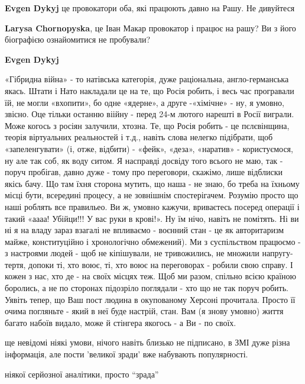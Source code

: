 \begin{itemize}
\begin{itemize}
\textbf{Evgen Dykyj} це провокатори оба, які працюють давно на Рашу. Не дивуйтеся

\textbf{Larysa Chornopyska}, це Іван Макар провокатор і працює на рашу? Ви з його біографією ознайомитися не пробували?

\textbf{Evgen Dykyj} 

«Гібридна війна» - то натівська категорія, дуже раціональна, англо-германська
якась. Штати і Нато накладали це на те, що Росія робить, і весь час програвали
їй, не могли «вхопити», бо одне «ядерне», а друге -«хімічне» - ну, я умовно,
звісно. Оце тільки останню віійну - перед 24-м лютого нарешті в Росії виграли.
Може когось з росіян залучили, хтозна. Те, що Росія робить - це пєлєвінщина,
теорія віртуальних реальностей і т.д., навіть слова нелегко підібрати, щоб
«запеленгувати» (і, отже, відбити) - «фейк», «деза», «наратив» - користуємося,
ну але так соб, як воду ситом. Я насправді досвіду того всього не маю, так -
поруч пробігав, давно дуже - тому про переговори, скажімо, лише відблиски якісь
бачу. Що там їхня сторона мутить, що наша - не знаю, бо треба на їхньому місці
бути, всередині процесу, а не зовнішнім спостерігачем. Розумію просто що наші
роблять все правильео. Ви ж, умовно кажучи, вриваєтесь посеред операції і такий
«аааа! Убійци!!! У вас руки в крові!». Ну їм нічо, навіть не помітять. Ні ви ні
я на владу зараз взагалі не впливаємо - воєнний стан - це як авторитаризм
майже, конституційно і хронологічно обмежений). Ми з суспільством працюємо - з
настроями людей - щоб не кіпішували, не тривожились, не множили напругу-тертя,
допоки ті, хто воює, ті, хто воює на переговорах - робили свою справу. І кожен
з нас, хто де - на своїх місцях теж. Щоб ми разом, спільно всією країною
боролись, а не по сторонах підозріло поглядали - хто що не так поруч робить.
Уявіть тепер, що Ваш пост людина в окупованому Херсоні прочитала. Просто її
очима погляньте - який в неї буде настрій, стан. Вам (я знову умовно) життя
багато набоїв видало, може й стінгера якогось - а Ви - по своїх.

\end{itemize} %


ще невідомі ніякі умови, нічого навіть близько не підписано, в ЗМІ дуже різна
інформація, але пости 'великої зради' вже набувають популярності.

ніякої серйозної аналітики, просто \enquote{зрада}


\end{itemize}
